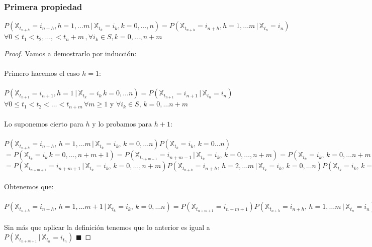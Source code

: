 \documentclass[12pt,a4paper]{article}
\newcommand*{\qed}{\hfill\ensuremath{\blacksquare}}
\begin{document}
\subsubsection{Primera propiedad}
$P(\mathbb{X}_{t_{n+h}}=i_{n+h}, h=1,\ldots m \, | \, \mathbb{X}_{t_k}=i_k, k=0,\ldots ,n)=P(\mathbb{X}_{t_{n+h}}=i_{n+h}, h=1,\ldots m\, |\, \mathbb{X}_{t_n}=i_n )$
\\
$\forall 0 \leq t_1< t_2, \ldots , < t_n+m\, , \forall i_k\in S, k=0,\ldots , n+m$
\begin{proof}
Vamos a demostrarlo por inducción:
\\\\
Primero hacemos el caso $h=1$:
\\\\
$P(\mathbb{X}_{t_{n+1}}=i_{n+1},h=1 \, |\, \mathbb{X}_{t_k}=i_k\, k=0,\ldots n)=P(\mathbb{X}_{t_{n+1}}=i_{n+1}\, | \,\mathbb{X}_{t_n}=i_n)$
\\
$\forall 0\leq t_1<t_2<\ldots <t_{n+m}\, \forall m\geq 1$ y $\forall i_k \in S, \,k=0,\ldots n+m$
\\\\
Lo suponemos cierto para $h$ y lo probamos para $h+1$:
\\\\
$P(\mathbb{X}_{t_{n+h}}=i_{n+h},\, h=1,\ldots m \, | \, \mathbb{X}_{t_k}=i_k ,\, k=0,\ldots n)P(\mathbb{X}_{t_k}=i_k,\, k=0\ldots n)$
\\
$=P(\mathbb{X}_{t_k}=i_k\, k=0,\ldots ,n+m+1)=P(\mathbb{X}_{t_{n+m-1}}=i_{n+m-1}\, | \, \mathbb{X}_{t_k}=i_k,\, k=0,\ldots , n+m)=P(\mathbb{X}_{t_k}=i_k,\, k=0,\ldots n+m)=P(\mathbb{X}_{t_{n+m+1}}=i_{n+m+1}\, | \, \mathbb{X}_{t_k}=i_k,\, k=0,\ldots ,n+m)=P(\mathbb{X}_{t_{n+h}}=i_{n+h},\, h=1,\ldots m \, | \, \mathbb{X}_{t_k}=i_k ,\, k=0,\ldots n)P(\mathbb{X}_{t_k}=i_k,\, k=0\ldots n)$
\\
$=P(\mathbb{X}_{t_{n+m+1}}=i_{n+m+1}\, | \, \mathbb{X}_{t_k}=i_k,\, k=0,\ldots ,n+m)P(\mathbb{X}_{t_{n+h}}=i_{n+h},\, h=2,\ldots m \, | \, \mathbb{X}_{t_k}=i_k ,\, k=0,\ldots n)P(\mathbb{X}_{t_k}=i_k,\, k=0\ldots n)$
\\\\
Obtenemos que:
\\\\
$P(\mathbb{X}_{t_{n+h}}=i_{n+h},\, h=1,\ldots m+1 \, | \, \mathbb{X}_{t_k}=i_k ,\, k=0,\ldots n)=P(\mathbb{X}_{t_{n+m+1}}=i_{n+m+1})P(\mathbb{X}_{t_{n+h}}=i_{n+h},\, h=1,\ldots m\, | \, \mathbb{X}_{t_n}=i_n)$
\\\\
Sin más que aplicar la definición tenemos que lo anterior es igual a $P(\mathbb{X}_{t_{n+m+1}}\, | \, \mathbb{X}_{t_n}=i_{t_n})$
\qed
\end{proof}
\end{document}

